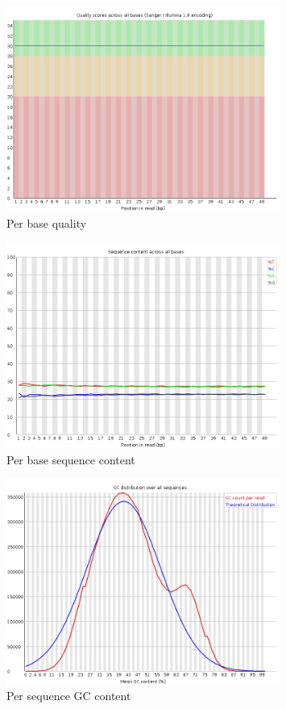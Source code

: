 \documentclass[UTF8]{ctexart}
\begin{document}
\begin{figure}[!htb]
	\centering
	\includegraphics[width=0.8\textwidth]{img/SRR14325859_FastQC_Origin_img/per_base_quality.png}	%
	\caption{Per base quality\protect}    %
\end{figure}

\begin{figure}[!htb]
	\centering
	\includegraphics[width=0.8\textwidth]{img/SRR14325859_FastQC_Origin_img/per_base_sequence_content.png}	%
	\caption{Per base sequence content\protect}    %
\end{figure}

\begin{figure}[!htb]
	\centering
	\includegraphics[width=0.8\textwidth]{img/SRR14325859_FastQC_Origin_img/per_sequence_gc_content.png}	%
	\caption{Per sequence GC content\protect}    %
\end{figure}
\end{document}
